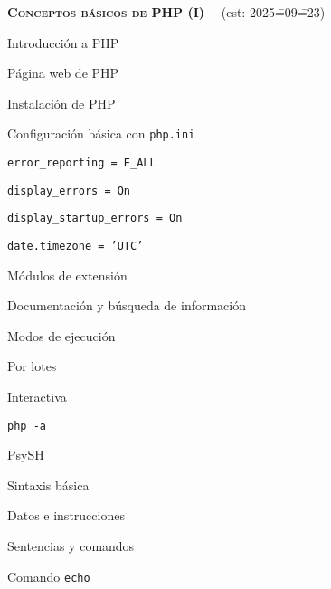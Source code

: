 \begin{longenum}
\begin{longenum}
\begin{longenum}
\begin{longenum}
            \end{longenum}
        \end{longenum}
    \end{longenum}
    \item \textbf{\textsc{Conceptos básicos de PHP (I)}} \ \ (est: 2025\==09\==23)
    \begin{longenum}
        \item Introducción a PHP
        \begin{longenum}
            \item Página web de PHP
            \item Instalación de PHP
            \item Configuración básica con \texttt{php.ini}
            \begin{longenum}
                \item \texttt{error\_reporting = E\_ALL}
                \item \texttt{display\_errors = On}
                \item \texttt{display\_startup\_errors = On}
                \item \texttt{date.timezone = 'UTC'}
            \end{longenum}
            \item Módulos de extensión
            \item Documentación y búsqueda de información
            \item Modos de ejecución \opcional\
            \begin{longenum}
                \item Por lotes
                \item Interactiva
                \begin{longenum}
                    \item \texttt{php -a}
                    \item PsySH
                \end{longenum}
            \end{longenum}
        \end{longenum}
        \item Sintaxis básica
        \begin{longenum}
            \item Datos e instrucciones
            \item Sentencias y comandos
            \begin{longenum}
                \item Comando \texttt{echo}

\end{longenum}
\end{longenum}
\end{longenum}
\end{longenum}
